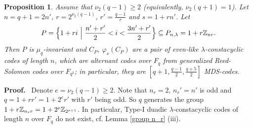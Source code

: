 \documentclass{article}
\newtheorem{Proposition}[Theorem]{Proposition}
\numberwithin{equation}{section}
\numberwithin{table}{section}
\def\Z{{\Bbb Z}}
\def\mb#1{\mbox{\boldmath$#1$}}
\def\pf{\par{\bf Proof.}~ }
\def\M{{\varphi}} \def\N{{\psi}} \def\m{{\mu}}
\begin{document}

\begin{Proposition}\label{a GRS}
Assume that $\nu_2(q-1)\ge 2$
(equivalently, $\nu_2(q+1)=1$).
Let $n=q+1=2n'$, $r=2^{\nu_2(q-1)}$, $r'=\frac{q-1}{r}$
and $s=1+rn'$. Let
$$
 P=\Big\{ 1+ri ~\Big|~ \frac{n'+r'}{2}<i<\frac{3n'+r'}{2} \Big\}
  \subseteq P_{n,\lambda}=1+r\Z_{nr}.
$$
Then $P$ is $\mu_q$-invariant and
$C_P$, $\M_s(C_P)$ are a pair of even-like $\lambda$-constacyclic codes
of length $n$, which are alternant codes over $F_q$
from generalized Reed-Solomon codes over $F_{q^2}$;
in particular, they are $[q+1,\frac{q-1}{2},\frac{q+5}{2}]$ MDS-codes.
\end{Proposition}

\pf Denote $e=\nu_2(q-1)\ge 2$.
Note that $n_r=2$, $n_r'=n'$ is odd and $q=1+rr'=1+2^{e}r'$ with $r'$ being odd.
So $q$ generates the group $1+r\Z_{n_r r}=1+2^e\Z_{2^{e+1}}$.
In particular, Type-I duadic $\lambda$-constacyclic codes of length $n$
over $F_q$ do not exist, cf. Lemma \ref{group n_r} (iii).
\end{document}
